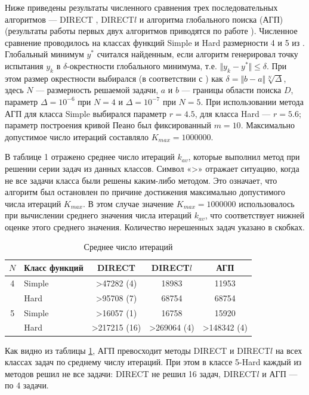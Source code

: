 \documentclass[a4paper]{article}
\begin{document}
Ниже приведены результаты численного сравнения трех последовательных алгоритмов --- DIRECT \cite{jonesLipOpt}, DIRECT\(l\)  \cite{gablonskyDirect} и алгоритма глобального поиска (АГП) (результаты работы первых двух алгоритмов приводятся по работе \cite{sergKvaDiaPaper}). Численное сравнение проводилось на классах функций Simple и Hard размерности 4 и 5 из \cite{sergKvaDiaPaper}. Глобальный минимум \(y^*\) считался найденным, если алгоритм генерировал точку испытания \(y_k\) в \(\delta\)-окрестности глобального минимума, т.е. \(\Vert y_k-y^*\Vert\leqslant\delta\). При этом размер окрестности выбирался (в соответствии с \cite{sergKvaDiaPaper}) как \(\delta=\Vert b-a\Vert \sqrt[N]{\Delta}\), здесь \(N\) --- размерность решаемой задачи, \(a\) и \(b\) --- границы области поиска \(D\), параметр \(\Delta=10^{-6}\) при \(N=4\) и \(\Delta=10^{-7}\) при \(N=5\). При использовании метода АГП для класса Simple выбирался параметр \(r=4.5\), для класса Hard --- \(r=5.6\); параметр построения кривой Пеано был фиксированный \(m=10\). Максимально допустимое число итераций составляло \(K_{max} = 1 000 000\).
\par
В таблице 1 отражено среднее число итераций \(k_{av}\), которые выполнил метод при решении серии задач из данных классов. Символ «>» отражает ситуацию, когда не все задачи класса были решены каким-либо методом. Это означает, что алгоритм был остановлен по причине достижения максимально допустимого числа итераций \(K_{max}\). В этом случае значение \(K_{max}=1 000 000\) использовалось при вычислении среднего значения числа итераций \(k_{av}\), что соответствует нижней оценке этого среднего значения. Количество нерешенных задач указано в скобках.
\begin{table}
    \centering
    \begin{tabular}{|c|p{3cm}|c|c|c|}
    \hline
    \(N\) & Класс функций & DIRECT & DIRECT\(l\) & АГП \\ \hline
    4 & Simple & >47282 (4) & 18983 & 11953\\ \cline{2-5}
      & Hard & >95708 (7) & 68754 & 68754\\ \hline
    5 & Simple & >16057 (1) & 16758 & 15920\\ \cline{2-5}
      & Hard & >217215 (16) & >269064 (4) & >148342 (4)\\ \hline
    \end{tabular}
    \caption{Среднее число итераций}
    \label{table:average_iters}
\end{table}
\par
Как видно из таблицы \ref{table:average_iters}, АГП превосходит методы DIRECT и DIRECT\(l\) на всех классах задач по среднему числу итераций. При этом в классе 5-Hard каждый из методов решил не все задачи: DIRECT не решил 16 задач, DIRECT\(l\) и АГП --- по 4 задачи.
\end{document}

